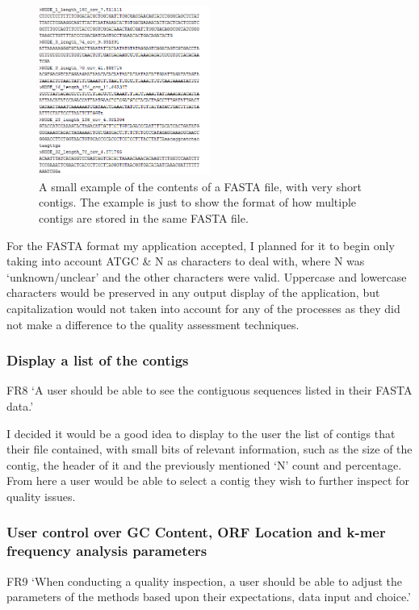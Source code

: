 \begin{figure}[H]
\centering
\includegraphics[width=0.5\textwidth]{images/fastaexample}
\caption{A small example of the contents of a FASTA file, with very short contigs. The example is just to show the format of how multiple contigs are stored in the same FASTA file.}
\end{figure}

For the FASTA format my application accepted, I planned for it to begin only taking into account ATGC \& N as characters to deal with, where N was `unknown/unclear' and the other characters were valid. Uppercase and lowercase characters would be preserved in any output display of the application, but capitalization would not taken into account for any of the processes as they did not make a difference to the quality assessment techniques.

\subsubsection{Display a list of the contigs}
FR8 `A user should be able to see the contiguous sequences listed in their FASTA data.'

I decided it would be a good idea to display to the user the list of contigs that their file contained, with small bits of relevant information, such as the size of the contig, the header of it and the previously mentioned `N' count and percentage. From here a user would be able to select a contig they wish to further inspect for quality issues.

\subsubsection{User control over GC Content, ORF Location and k-mer frequency analysis parameters}
FR9 `When conducting a quality inspection, a user should be able to adjust the parameters of the methods based upon their expectations, data input and choice.'

